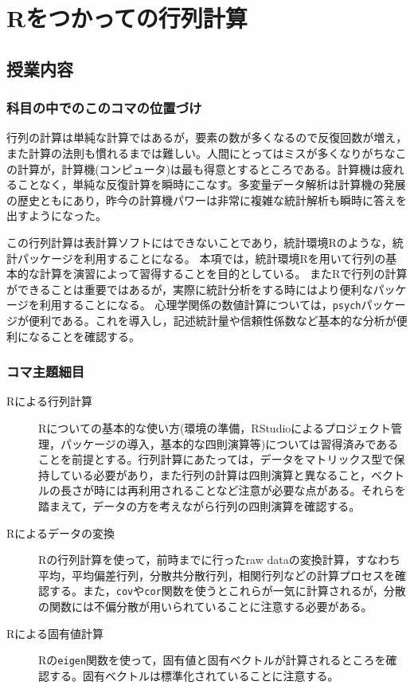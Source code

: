 \section{Rをつかっての行列計算}
\subsection{授業内容}
\subsubsection{科目の中でのこのコマの位置づけ}
行列の計算は単純な計算ではあるが，要素の数が多くなるので反復回数が増え，また計算の法則も慣れるまでは難しい。人間にとってはミスが多くなりがちなこの計算が，計算機(コンピュータ)は最も得意とするところである。計算機は疲れることなく，単純な反復計算を瞬時にこなす。多変量データ解析は計算機の発展の歴史ともにあり，昨今の計算機パワーは非常に複雑な統計解析も瞬時に答えを出すようになった。

この行列計算は表計算ソフトにはできないことであり，統計環境Rのような，統計パッケージを利用することになる。
本項では，統計環境Rを用いて行列の基本的な計算を演習によって習得することを目的としている。
またRで行列の計算ができることは重要ではあるが，実際に統計分析をする時にはより便利なパッケージを利用することになる。
心理学関係の数値計算については，\texttt{psych}パッケージが便利である。これを導入し，記述統計量や信頼性係数など基本的な分析が便利になることを確認する。
\subsubsection{コマ主題細目}
\begin{description}
	\item[Rによる行列計算] Rについての基本的な使い方(環境の準備，RStudioによるプロジェクト管理，パッケージの導入，基本的な四則演算等)については習得済みであることを前提とする。行列計算にあたっては，データをマトリックス型で保持している必要があり，また行列の計算は四則演算と異なること，ベクトルの長さが時には再利用されることなど注意が必要な点がある。それらを踏まえて，データの方を考えながら行列の四則演算を確認する。
	\item[Rによるデータの変換] Rの行列計算を使って，前時までに行ったraw dataの変換計算，すなわち平均，平均偏差行列，分散共分散行列，相関行列などの計算プロセスを確認する。また，\texttt{cov}や\texttt{cor}関数を使うとこれらが一気に計算されるが，分散の関数には不偏分散が用いられていることに注意する必要がある。
	\item[Rによる固有値計算] Rの\texttt{eigen}関数を使って，固有値と固有ベクトルが計算されるところを確認する。固有ベクトルは標準化されていることに注意する。
\end{description}
